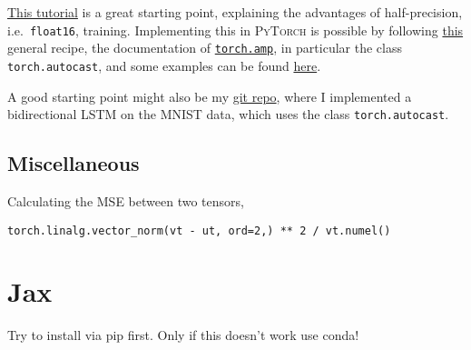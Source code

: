 \documentclass[12pt, a4paper]{scrbook}
\numberwithin{equation}{section}
\theoremstyle{definition}
\theoremstyle{definition}
\begin{document}
	\href{https://docs.nvidia.com/deeplearning/performance/mixed-precision-training/index.html}{This tutorial} is a great starting point, explaining the advantages of half-precision, i.e.~\texttt{float16}, training. Implementing this in \textsc{PyTorch} is possible by following \href{https://pytorch.org/tutorials/recipes/recipes/amp_recipe.html}{this} general recipe, the documentation of \href{https://pytorch.org/docs/stable/amp.html}{\texttt{torch.amp}}, in particular the class \texttt{torch.autocast}, and some examples can be found \href{https://pytorch.org/docs/stable/notes/amp_examples.html#amp-examples}{here}. 
	
	A good starting point might also be my \href{https://github.com/ImahnShekhzadeh/mnist-lstm/}{git repo}, where I implemented a bidirectional LSTM on the MNIST data, which uses the class \texttt{torch.autocast}.
	
	\section{Miscellaneous}
	
		Calculating the MSE between two tensors,
		
		\begin{lstlisting}[style=mystylepython, label=alg:torch__vector_norm, xleftmargin=\parindent]
			torch.linalg.vector_norm(vt - ut, ord=2,) ** 2 / vt.numel()
		\end{lstlisting}
	
	\chapter{Jax}
	
	Try to install via pip first. Only if this doesn't work use conda!
	
\end{document}
